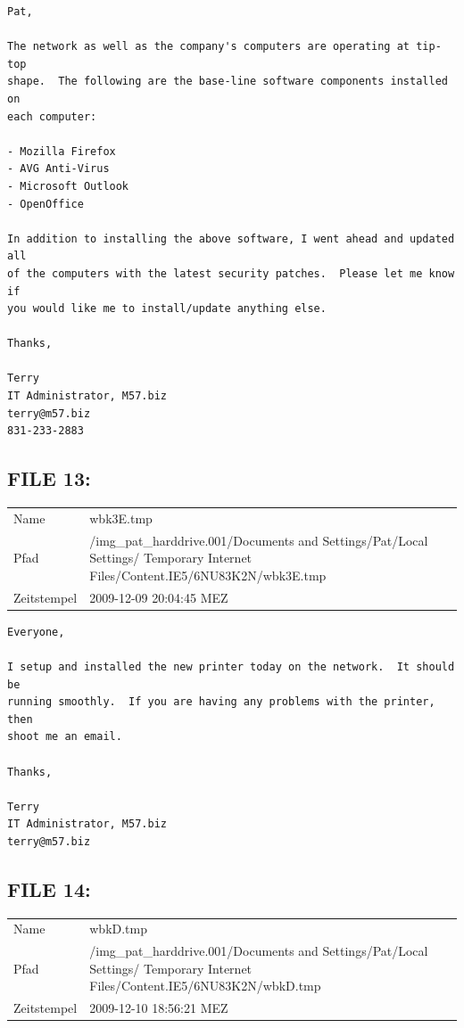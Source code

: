 \begin{lstlisting}
Pat,

The network as well as the company's computers are operating at tip-top 
shape.  The following are the base-line software components installed on 
each computer:

- Mozilla Firefox
- AVG Anti-Virus
- Microsoft Outlook
- OpenOffice

In addition to installing the above software, I went ahead and updated all 
of the computers with the latest security patches.  Please let me know if 
you would like me to install/update anything else.

Thanks,

Terry
IT Administrator, M57.biz
terry@m57.biz
831-233-2883
\end{lstlisting}

\subsection{FILE 13:}
\label{sec:pat_emails_13}

\begin{table}[htb]
	\begin{tabular}{p{2cm} p{13.5cm}}
		Name & wbk3E.tmp\\
		Pfad & /img_pat_harddrive.001/Documents and Settings/Pat/Local Settings/ Temporary Internet Files/Content.IE5/6NU83K2N/wbk3E.tmp\\
		Zeitstempel & 2009-12-09 20:04:45 MEZ
	\end{tabular}
\end{table}	

\begin{lstlisting}
Everyone,

I setup and installed the new printer today on the network.  It should be 
running smoothly.  If you are having any problems with the printer, then 
shoot me an email.

Thanks,

Terry
IT Administrator, M57.biz
terry@m57.biz
\end{lstlisting}	

\subsection{FILE 14:}	
\label{sec:pat_emails_14}

\begin{table}[htb]
	\begin{tabular}{p{2cm} p{13.5cm}}
		Name & wbkD.tmp\\
		Pfad & /img_pat_harddrive.001/Documents and Settings/Pat/Local Settings/ Temporary Internet Files/Content.IE5/6NU83K2N/wbkD.tmp\\
		Zeitstempel & 2009-12-10 18:56:21 MEZ
	\end{tabular}
\end{table}	

